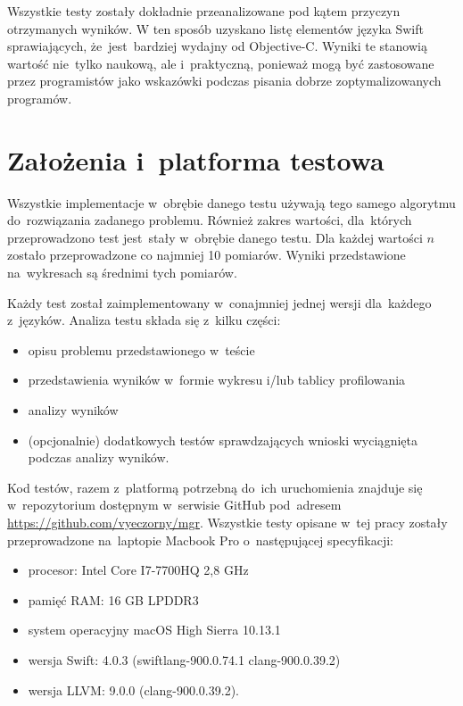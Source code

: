 \documentclass[mgr, shortabstract]{iithesis}
\begin{document}
Wszystkie testy zostały dokładnie przeanalizowane pod kątem przyczyn otrzymanych wyników. W ten sposób uzyskano listę elementów języka Swift sprawiających, że~jest~bardziej wydajny od Objective-C. Wyniki te stanowią wartość nie~tylko naukową, ale i~praktyczną, ponieważ mogą być zastosowane przez programistów jako wskazówki podczas pisania dobrze zoptymalizowanych programów.

\section{Założenia i~platforma testowa}

Wszystkie implementacje w~obrębie danego testu używają tego samego algorytmu do~rozwiązania zadanego problemu. Również zakres wartości, dla~których przeprowadzono test jest~stały w~obrębie danego testu. Dla każdej wartości $n$ zostało przeprowadzone co najmniej 10 pomiarów. Wyniki przedstawione na~wykresach są średnimi tych pomiarów.

Każdy test został zaimplementowany w~conajmniej jednej wersji dla~każdego z~języków. Analiza testu składa się z~kilku części:

\begin{itemize}
    \item opisu problemu przedstawionego w~teście
    \item przedstawienia wyników w~formie wykresu i/lub tablicy profilowania
    \item analizy wyników
    \item (opcjonalnie) dodatkowych testów sprawdzających wnioski wyciągnięta podczas analizy wyników.
\end{itemize}

Kod testów, razem z~platformą potrzebną do~ich uruchomienia znajduje się w~repozytorium dostępnym w~serwisie GitHub pod~adresem \url{https://github.com/vyeczorny/mgr}. Wszystkie testy opisane w~tej pracy zostały przeprowadzone na~laptopie Macbook Pro o~następującej specyfikacji:

\begin{itemize}
    \item procesor: Intel Core I7-7700HQ 2,8 GHz
    \item pamięć RAM: 16 GB LPDDR3
    \item system operacyjny macOS High Sierra 10.13.1
    \item wersja Swift: 4.0.3 (swiftlang-900.0.74.1 clang-900.0.39.2)
    \item wersja LLVM: 9.0.0 (clang-900.0.39.2).
\end{itemize}
\end{document}
